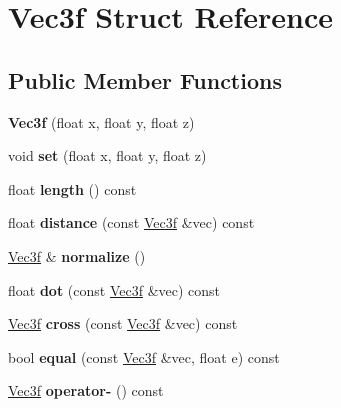 \hypertarget{struct_vec3f}{}\section{Vec3f Struct Reference}
\label{struct_vec3f}
\subsection*{Public Member Functions}
\begin{DoxyCompactItemize}
\item 
\mbox{\label{struct_vec3f_ae5a91a93e91ea3310aab46fa477e5269}} 
{\bfseries Vec3f} (float x, float y, float z)
\item 
\mbox{\label{struct_vec3f_a894691dce0a75d8f1039e88cc4c3af75}} 
void {\bfseries set} (float x, float y, float z)
\item 
\mbox{\label{struct_vec3f_a68c16b5ebcbf4fff09cbffbbaa0097f8}} 
float {\bfseries length} () const
\item 
\mbox{\label{struct_vec3f_a981c4fd40de33add96e12a0423cf8736}} 
float {\bfseries distance} (const \hyperlink{struct_vec3f}{Vec3f} \&vec) const
\item 
\mbox{\label{struct_vec3f_a68eb57ed7ce14faefc647467645877e4}} 
\hyperlink{struct_vec3f}{Vec3f} \& {\bfseries normalize} ()
\item 
\mbox{\label{struct_vec3f_a0dc51a0c636edf0d38ed3d3d2dbf6c7c}} 
float {\bfseries dot} (const \hyperlink{struct_vec3f}{Vec3f} \&vec) const
\item 
\mbox{\label{struct_vec3f_adf62f43331d53063bd2923e7dda1a831}} 
\hyperlink{struct_vec3f}{Vec3f} {\bfseries cross} (const \hyperlink{struct_vec3f}{Vec3f} \&vec) const
\item 
\mbox{\label{struct_vec3f_aa5579f11b3664d5c4de45a2eec990752}} 
bool {\bfseries equal} (const \hyperlink{struct_vec3f}{Vec3f} \&vec, float e) const
\item 
\mbox{\label{struct_vec3f_a589e83cbb2ed856fadf99851a7f9bb72}} 
\hyperlink{struct_vec3f}{Vec3f} {\bfseries operator-\/} () const

\end{DoxyCompactItemize}

